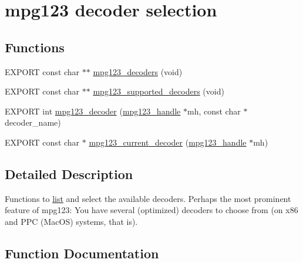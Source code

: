 \hypertarget{group__mpg123__decoder}{}\section{mpg123 decoder selection}
\label{group__mpg123__decoder}
\subsection*{Functions}
\begin{DoxyCompactItemize}
\item 
E\+X\+P\+O\+RT const char $\ast$$\ast$ \hyperlink{group__mpg123__decoder_ga3e8b169646870ff0848840c6f555ce6f}{mpg123\+\_\+decoders} (void)
\item 
E\+X\+P\+O\+RT const char $\ast$$\ast$ \hyperlink{group__mpg123__decoder_ga73a5e970f8ab6b12778e5959373721d8}{mpg123\+\_\+supported\+\_\+decoders} (void)
\item 
E\+X\+P\+O\+RT int \hyperlink{group__mpg123__decoder_ga44229d1ae46066bf06ea4cd0867848a1}{mpg123\+\_\+decoder} (\hyperlink{group__mpg123__init_ga6728e2839a395f3a07d4514da659faca}{mpg123\+\_\+handle} $\ast$mh, const char $\ast$decoder\+\_\+name)
\item 
E\+X\+P\+O\+RT const char $\ast$ \hyperlink{group__mpg123__decoder_ga96347ee6c5068e0abdd1acbe637d7bba}{mpg123\+\_\+current\+\_\+decoder} (\hyperlink{group__mpg123__init_ga6728e2839a395f3a07d4514da659faca}{mpg123\+\_\+handle} $\ast$mh)
\end{DoxyCompactItemize}


\subsection{Detailed Description}
Functions to \hyperlink{protocollist-p}{list} and select the available decoders. Perhaps the most prominent feature of mpg123\+: You have several (optimized) decoders to choose from (on x86 and P\+PC (Mac\+OS) systems, that is). 

\subsection{Function Documentation}
\mbox{\label{group__mpg123__decoder_ga96347ee6c5068e0abdd1acbe637d7bba}} 
